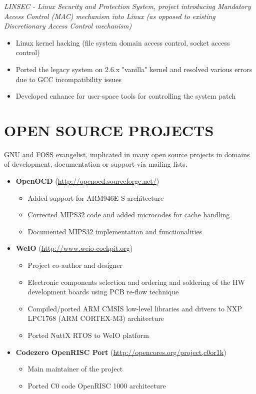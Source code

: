 \documentclass[a4paper, oneside, final]{scrartcl}
\begin{document}
\medskip

   \textit{LINSEC - Linux Security and Protection System, project introducing 
            Mandatory Access Control (MAC) mechanism into Linux 
            (as opposed to existing Discretionary Access Control mechanism)}
\begin{itemize}
   \item Linux kernel hacking (file system domain access control, socket access control)
   \item Ported the legacy system on 2.6.x "vanilla" kernel and 
            resolved various errors due to GCC incompatibility issues
   \item Developed enhance for user-space tools for controlling the system patch
\end{itemize}


\section{OPEN SOURCE PROJECTS}
GNU and FOSS evangelist, implicated in many open source projects in domains of
development, documentation or support via mailing lists.

\begin{itemize}
   \item \textbf{OpenOCD} (\url{http://openocd.sourceforge.net/})
      \begin{itemize}
         \item Added support for ARM946E-S architecture
         \item Corrected MIPS32 code and added microcodes for cache handling
         \item Documented MIPS32 implementation and functionalities
      \end{itemize}
   \item \textbf{WeIO} (\url{http://www.weio-cockpit.org})
      \begin{itemize}
         \item Project co-author and designer 
         \item Electronic components selection and ordering and soldering of
               the HW development boards using PCB re-flow technique
         \item Compiled/ported ARM CMSIS low-level libraries and drivers to NXP
                  LPC1768 (ARM CORTEX-M3) architecture
         \item Ported NuttX RTOS to WeIO platform
      \end{itemize}
   \item \textbf{Codezero OpenRISC Port} (\url{http://opencores.org/project,c0or1k})
      \begin{itemize}
         \item Main maintainer of the project 
         \item Ported C0 code OpenRISC 1000 architecture
      \end{itemize}
\end{itemize}
\end{document}
